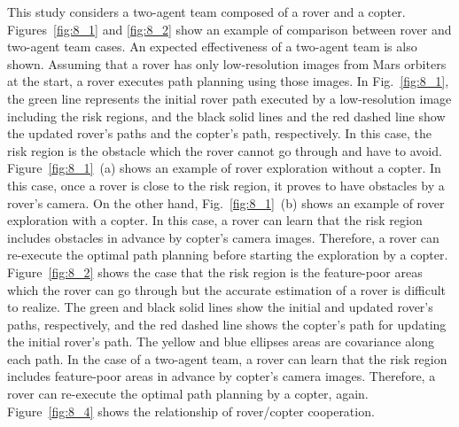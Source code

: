 \documentclass[conference]{IEEEtran}
\begin{document}
This study considers a two-agent team composed of a rover and a copter. Figures~\ref{fig:8_1} and \ref{fig:8_2} show an example of comparison between rover and two-agent team cases. An expected effectiveness of a two-agent team is also shown. Assuming that a rover has only low-resolution images from Mars orbiters at the start, a rover executes path planning using those images.
In Fig.~\ref{fig:8_1}, the green line represents the initial rover path executed by a low-resolution image including the risk regions, and the black solid lines and the red dashed line show the updated rover’s paths and the copter’s path, respectively. In this case, the risk region is the obstacle which the rover cannot go through and have to avoid. Figure~\ref{fig:8_1}~(a) shows an example of rover exploration without a copter. In this case, once a rover is close to the risk region, it proves to have obstacles by a rover’s camera. On the other hand, Fig.~\ref{fig:8_1}~(b) shows an example of rover exploration with a copter. In this case, a rover can learn that the risk region includes obstacles in advance by copter’s camera images. Therefore, a rover can re-execute the optimal path planning before starting the exploration by a copter.
Figure~\ref{fig:8_2} shows the case that the risk region is the feature-poor areas which the rover can go through but the accurate estimation of a rover is difficult to realize. The green and black solid lines show the initial and updated rover’s paths, respectively, and the red dashed line shows the copter’s path for updating the initial rover’s path. The yellow and blue ellipses areas are covariance along each path. In the case of a two-agent team, a rover can learn that the risk region includes feature-poor areas in advance by copter’s camera images. Therefore, a rover can re-execute the optimal path planning by a copter, again.
Figure~\ref{fig:8_4} shows the relationship of rover/copter cooperation.
\end{document}
